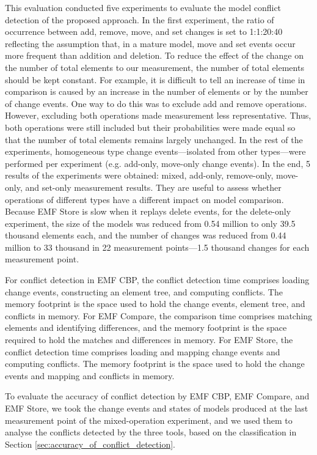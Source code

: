 This evaluation conducted five experiments to evaluate the model conflict detection of the proposed approach. In the first experiment, the ratio of occurrence between \textsf{add}, \textsf{remove}, \textsf{move}, and \textsf{set} changes is set to 1:1:20:40 reflecting the assumption that, in a mature model, \textsf{move} and \textsf{set} events occur more frequent than addition and deletion. To reduce the effect of the change on the number of total elements to our measurement, the number of total elements should be kept constant. For example, it is difficult to tell an increase of time in comparison is caused by an increase in the number of elements or by the number of change events. One way to do this was to exclude \textsf{add} and \textsf{remove} operations. However, excluding both operations made measurement less representative. Thus, both operations were still included but their probabilities were made equal so that the number of total elements remains largely unchanged. In the rest of the experiments,
homogeneous type change events—isolated from other types—were performed per experiment (e.g. add-only, move-only change events). In the end, 5 results of the experiments were obtained: mixed, add-only, remove-only, move-only, and set-only measurement results. They are useful to assess whether operations of different types have a different impact on model comparison. 
Because EMF Store is slow when it replays \textsf{delete} events, for the delete-only experiment, the size of the models was reduced from 0.54 million to only 39.5 thousand elements each, and the number of changes was reduced from 0.44 million to 33 thousand in 22 measurement points—1.5 thousand changes for each measurement point.

For conflict detection in EMF CBP, the conflict detection time comprises loading change events, constructing an element tree, and computing conflicts. The memory footprint is the space used to hold the change events, element tree, and conflicts in memory. For EMF Compare, the comparison time comprises matching elements and identifying differences, and the memory footprint is the space required to hold the matches and differences in memory. For EMF Store, the conflict detection time comprises loading and mapping change events and computing conflicts. The memory footprint is the space used to hold the change events and mapping and conflicts in memory.

To evaluate the accuracy of conflict detection by EMF CBP, EMF Compare, and EMF Store, we took the change events and states of models produced at the last measurement point of the mixed-operation experiment, and we used them to analyse the conflicts detected by the three tools, based on the classification in Section \ref{sec:accuracy_of_conflict_detection}.

